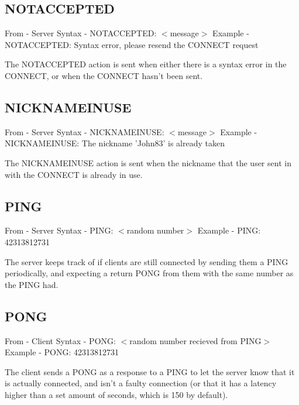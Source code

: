 \documentclass[12pt]{rapport}
\begin{document}
\subsection*{NOTACCEPTED}
From    - Server\newline
Syntax  - NOTACCEPTED: $<$message$>$\newline
Example - NOTACCEPTED: Syntax error, please resend the CONNECT request\newline

\noindent The NOTACCEPTED action is sent when either there is a syntax
error in the CONNECT, or when the CONNECT hasn't been sent.

\subsection*{NICKNAMEINUSE}
From    - Server\newline
Syntax  - NICKNAMEINUSE: $<$message$>$\newline
Example - NICKNAMEINUSE: The nickname 'John83' is already taken\newline

\noindent The NICKNAMEINUSE action is sent when the nickname that the
user sent in with the CONNECT is already in use.

\subsection*{PING}
From    - Server\newline
Syntax  - PING: $<$random number$>$\newline
Example - PING: 42313812731\newline

\noindent The server keeps track of if clients are still connected by
sending them a PING periodically, and expecting a return PONG from
them with the same number as the PING had.

\subsection*{PONG}
From    - Client\newline
Syntax  - PONG: $<$random number recieved from PING$>$\newline
Example - PONG: 42313812731\newline

\noindent The client sends a PONG as a response to a PING to let the
server know that it is actually connected, and isn't a faulty
connection (or that it has a latency higher than a set amount of
seconds, which is 150 by default).
\end{document}
